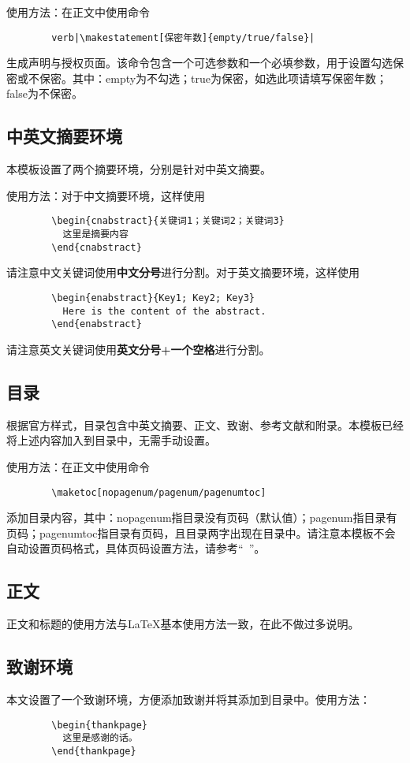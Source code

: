 \documentclass[UTF8]{ctexart}
\begin{document}
	使用方法：在正文中使用命令
	\begin{verbatim}
		verb|\makestatement[保密年数]{empty/true/false}|
	\end{verbatim}
	生成声明与授权页面。该命令包含一个可选参数和一个必填参数，用于设置勾选保密或不保密。其中：empty为不勾选；true为保密，如选此项请填写保密年数；false为不保密。
	
	\subsection{中英文摘要环境}
	本模板设置了两个摘要环境，分别是针对中英文摘要。
	
	使用方法：对于中文摘要环境，这样使用
	\begin{verbatim}
		\begin{cnabstract}{关键词1；关键词2；关键词3}
		  这里是摘要内容
		\end{cnabstract}
	\end{verbatim}
	请注意中文关键词使用{\bfseries 中文分号}进行分割。对于英文摘要环境，这样使用
	\begin{verbatim}
		\begin{enabstract}{Key1; Key2; Key3}
		  Here is the content of the abstract.
		\end{enabstract}
	\end{verbatim}
	请注意英文关键词使用{\bfseries 英文分号+一个空格}进行分割。
	
	\subsection{目录}\label{subsec:toc}
	根据官方样式，目录包含中英文摘要、正文、致谢、参考文献和附录。本模板已经将上述内容加入到目录中，无需手动设置。
	
	使用方法：在正文中使用命令
	\begin{verbatim}
		\maketoc[nopagenum/pagenum/pagenumtoc]
	\end{verbatim}
	添加目录内容，其中：nopagenum指目录没有页码（默认值）；pagenum指目录有页码；pagenumtoc指目录有页码，且目录两字出现在目录中。请注意本模板不会自动设置页码格式，具体页码设置方法，请参考“{\itshape ~}”。
	
	\subsection{正文}
	正文和标题的使用方法与\LaTeX 基本使用方法一致，在此不做过多说明。
	
	\subsection{致谢环境}
	本文设置了一个致谢环境，方便添加致谢并将其添加到目录中。使用方法：
	\begin{verbatim}
		\begin{thankpage}
		  这里是感谢的话。
		\end{thankpage}
	\end{verbatim}
	
\end{document}
